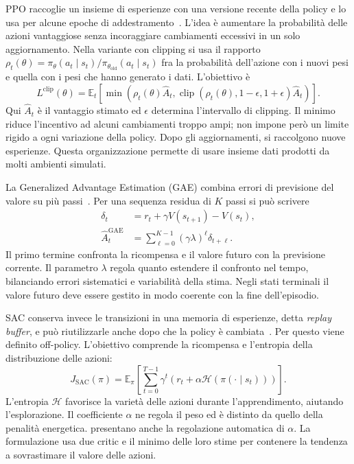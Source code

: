 PPO raccoglie un insieme di esperienze con una versione recente della policy e lo usa per alcune epoche di addestramento~\citep{Schulman2017PPO}. L'idea è aumentare la probabilità delle azioni vantaggiose senza incoraggiare cambiamenti eccessivi in un solo aggiornamento. Nella variante con clipping si usa il rapporto
$\rho_t(\theta)=\pi_\theta(a_t\mid s_t)/\pi_{\theta_{\mathrm{old}}}(a_t\mid s_t)$
fra la probabilità dell'azione con i nuovi pesi e quella con i pesi che hanno generato i dati. L'obiettivo è
\begin{equation}
    L^{\mathrm{clip}}(\theta)=\mathbb{E}_t\!\left[
        \min\!\left(\rho_t(\theta)\widehat A_t,
        \operatorname{clip}(\rho_t(\theta),1-\epsilon,1+\epsilon)\widehat A_t\right)
    \right].
    \label{eq:sota-ppo}
\end{equation}
Qui $\widehat A_t$ è il vantaggio stimato ed $\epsilon$ determina l'intervallo di clipping. Il minimo riduce l'incentivo ad alcuni cambiamenti troppo ampi; non impone però un limite rigido a ogni variazione della policy. Dopo gli aggiornamenti, si raccolgono nuove esperienze. Questa organizzazione permette di usare insieme dati prodotti da molti ambienti simulati.

La Generalized Advantage Estimation (GAE) combina errori di previsione del valore su più passi~\citep{Schulman2016GAE}. Per una sequenza residua di $K$ passi si può scrivere
\begin{equation}
\begin{split}
    \delta_t&=r_t+\gamma V(s_{t+1})-V(s_t),\\
    \widehat A_t^{\mathrm{GAE}}&=\sum_{\ell=0}^{K-1}(\gamma\lambda)^\ell\delta_{t+\ell}.
\end{split}
    \label{eq:sota-gae}
\end{equation}
Il primo termine confronta la ricompensa e il valore futuro con la previsione corrente. Il parametro $\lambda$ regola quanto estendere il confronto nel tempo, bilanciando errori sistematici e variabilità della stima. Negli stati terminali il valore futuro deve essere gestito in modo coerente con la fine dell'episodio.

SAC conserva invece le transizioni in una memoria di esperienze, detta \emph{replay buffer}, e può riutilizzarle anche dopo che la policy è cambiata~\citep{Haarnoja2018SAC}. Per questo viene definito off-policy. L'obiettivo comprende la ricompensa e l'entropia della distribuzione delle azioni:
\begin{equation}
    J_{\mathrm{SAC}}(\pi)=\mathbb{E}_{\pi}\!\left[
        \sum_{t=0}^{T-1}\gamma^t
        \left(r_t+\alpha\mathcal H(\pi(\cdot\mid s_t))\right)
    \right].
    \label{eq:sota-sac}
\end{equation}
L'entropia $\mathcal H$ favorisce la varietà delle azioni durante l'apprendimento, aiutando l'esplorazione. Il coefficiente $\alpha$ ne regola il peso ed è distinto da quello della penalità energetica. \citet{Haarnoja2018Applications} presentano anche la regolazione automatica di $\alpha$. La formulazione usa due critic e il minimo delle loro stime per contenere la tendenza a sovrastimare il valore delle azioni.


